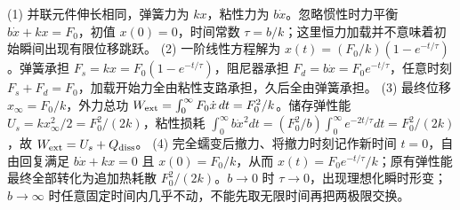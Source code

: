 (1) 并联元件伸长相同，弹簧力为 \(kx\)，粘性力为 \(b\dot x\)。忽略惯性时力平衡 \(b\dot x+kx=F_0\)，初值 \(x(0)=0\)，时间常数 \(\tau=b/k\)；这里恒力加载并不意味着初始瞬间出现有限位移跳跃。
(2) 一阶线性方程解为 \(x(t)=(F_0/k)(1-e^{-t/\tau})\)。弹簧承担 \(F_s=kx=F_0(1-e^{-t/\tau})\)，阻尼器承担 \(F_d=b\dot x=F_0e^{-t/\tau}\)，任意时刻 \(F_s+F_d=F_0\)，加载开始力全由粘性支路承担，久后全由弹簧承担。
(3) 最终位移 \(x_\infty=F_0/k\)，外力总功 \(W_{\rm ext}=\int_0^\infty F_0\dot x\,dt=F_0^2/k\)。储存弹性能 \(U_s=kx_\infty^2/2=F_0^2/(2k)\)，粘性损耗 \(\int_0^\infty b\dot x^2dt=(F_0^2/b)\int_0^\infty e^{-2t/\tau}dt=F_0^2/(2k)\)，故 \(W_{\rm ext}=U_s+Q_{\rm diss}\)。
(4) 完全蠕变后撤力、将撤力时刻记作新时间 \(t=0\)，自由回复满足 \(b\dot x+kx=0\) 且 \(x(0)=F_0/k\)，从而 \(x(t)=F_0e^{-t/\tau}/k\)；原有弹性能最终全部转化为追加热耗散 \(F_0^2/(2k)\)。\(b\to0\) 时 \(\tau\to0\)，出现理想化瞬时形变；\(b\to\infty\) 时任意固定时间内几乎不动，不能先取无限时间再把两极限交换。
